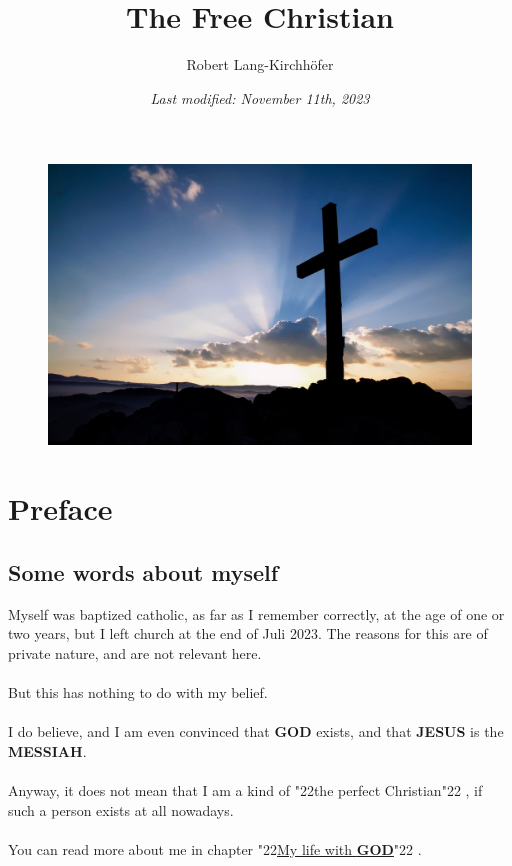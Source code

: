 \documentclass[12pt,a5paper]{article}
\title{\textbf{The Free Christian}}
\author{Robert Lang-Kirchh\"ofer}
\date{\textit{Last modified: November 11th, 2023}}
\newcommand{\God}[0]{\textbf{GOD}}
\newcommand{\Jesus}[0]{\textbf{JESUS}}
\newcommand{\Messiah}[0]{\textbf{MESSIAH}}
\newcommand{\q}[1]{\char"22{#1}\char"22 }
\begin{document}
	\setlength{\parindent}{0mm}
	\maketitle
	\begin{figure}[h]
		\centering
		\includegraphics[width=1\textwidth,keepaspectratio]{"FreeChristian.jpeg"}
	\end{figure}

	\newpage
	\tableofcontents

	\newpage
	\section{Preface}
	
	\subsection{Some words about myself}
		Myself was baptized catholic,
		as far as I remember correctly,
		at the age of one or two years,
		but I left church at the end of Juli 2023.
		The reasons for this are of private nature,
		and are not relevant here.
		\\
		\\
		But this has nothing to do with my belief.
		\\
		\\
		I do believe,
		and I am even convinced that {\God} exists,
		and that {\Jesus} is the {\Messiah}.
		\\
		\\
		Anyway,
		it does not mean that I am a kind of \q{the perfect Christian},
		if such a person exists at all nowadays.
		\\
		\\
		You can read more about me in chapter \q{\hyperref[MeinLebenMitGott]{My life with {\God}}}.
	
\end{document}

